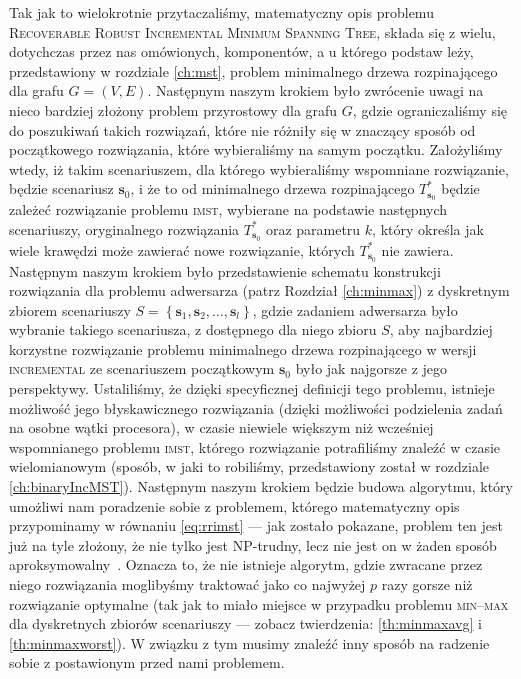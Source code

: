 Tak jak to wielokrotnie przytaczaliśmy, matematyczny opis problemu \textsc{Recoverable Robust Incremental Minimum Spanning Tree}, składa się z wielu, dotychczas przez nas omówionych, komponentów, a u którego podstaw leży, przedstawiony w rozdziale \ref{ch:mst}, problem minimalnego drzewa rozpinającego dla grafu $G = \left( V, E \right)$. Następnym naszym krokiem było zwrócenie uwagi na nieco bardziej złożony problem przyrostowy dla grafu $G$, gdzie ograniczaliśmy się do poszukiwań takich rozwiązań, które nie różniły się w znaczący sposób od początkowego rozwiązania, które wybieraliśmy na samym początku. Założyliśmy wtedy, iż takim scenariuszem, dla którego wybieraliśmy wspomniane rozwiązanie, będzie scenariusz $\textbf{s}_{0}$, i że to od minimalnego drzewa rozpinającego $T^{\ast}_{\textbf{s}_{0}}$ będzie zależeć rozwiązanie problemu \textsc{imst}, wybierane na podstawie następnych scenariuszy, oryginalnego rozwiązania $T^{\ast}_{\textbf{s}_{0}}$ oraz parametru $k$, który określa jak wiele krawędzi może zawierać nowe rozwiązanie, których $T^{\ast}_{\textbf{s}_{0}}$ nie zawiera. Następnym naszym krokiem było przedstawienie schematu konstrukcji rozwiązania dla problemu adwersarza (patrz Rozdział \ref{ch:minmax}) z dyskretnym zbiorem scenariuszy $S = \left\{ \textbf{s}_{1}, \textbf{s}_{2}, \dots, \textbf{s}_{l} \right\}$, gdzie zadaniem adwersarza było wybranie takiego scenariusza, z dostępnego dla niego zbioru $S$, aby najbardziej korzystne rozwiązanie problemu minimalnego drzewa rozpinającego w wersji \textsc{incremental} ze scenariuszem początkowym $\textbf{s}_{0}$ było jak najgorsze z jego perspektywy. Ustaliliśmy, że dzięki specyficznej definicji tego problemu, istnieje możliwość jego błyskawicznego rozwiązania (dzięki możliwości podzielenia zadań na osobne wątki procesora), w czasie niewiele większym niż wcześniej wspomnianego problemu \textsc{imst}, którego rozwiązanie potrafiliśmy znaleźć w czasie wielomianowym (sposób, w jaki to robiliśmy, przedstawiony został w rozdziale \ref{ch:binaryIncMST}). Następnym naszym krokiem będzie budowa algorytmu, który umożliwi nam poradzenie sobie z problemem, którego matematyczny opis przypominamy w równaniu \ref{eq:rrimst} --- jak zostało pokazane, problem ten jest już na tyle złożony, że nie tylko jest \textsc{NP}-trudny, lecz nie jest on w żaden sposób aproksymowalny~\cite[twierdzenie $6$]{Kasperski2014}. Oznacza to, że nie istnieje algorytm, gdzie zwracane przez niego rozwiązania moglibyśmy traktować jako co najwyżej $p$ razy gorsze niż rozwiązanie optymalne (tak jak to miało miejsce w przypadku problemu \textsc{min--max} dla dyskretnych zbiorów scenariuszy --- zobacz twierdzenia: \ref{th:minmaxavg} i \ref{th:minmaxworst}). W związku z tym musimy znaleźć inny sposób na radzenie sobie z postawionym przed nami problemem.

